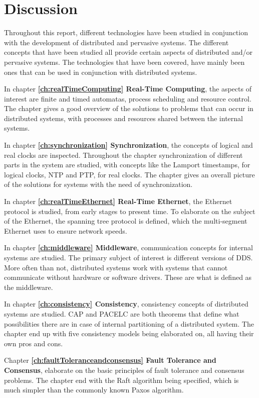 \chapter{Discussion} \label{ch:discussion}

Throughout this report, different technologies have been studied in conjunction with the development of distributed and pervasive systems. The different concepts that have been studied all provide certain aspects of distributed and/or pervasive systems. The technologies that have been covered, have mainly been ones that can be used in conjunction with distributed systems.

In chapter \textbf{\ref{ch:realTimeComputing} Real-Time Computing}, the aspects of interest are finite and timed automatas, process scheduling and resource control. The chapter gives a good overview of the solutions to problems that can occur in distributed systems, with processes and resources shared between the internal systems.

In chapter \textbf{\ref{ch:synchronization} Synchronization}, the concepts of logical and real clocks are inspected. Throughout the chapter synchronization of different parts in the system are studied, with concepts like the Lamport timestamps, for logical clocks, NTP and PTP, for real clocks. The chapter gives an overall picture of the solutions for systems with the need of synchronization.

In chapter \textbf{\ref{ch:realTimeEthernet} Real-Time Ethernet}, the Ethernet protocol is studied, from early stages to present time. To elaborate on the subject of the Ethernet, the spanning tree protocol is defined, which the multi-segment Ethernet uses to ensure network speeds. 

In chapter \textbf{\ref{ch:middleware} Middleware}, communication concepts for internal systems are studied. The primary subject of interest is different versions of DDS. More often than not, distributed systems work with systems that cannot communicate without hardware or software drivers. These are what is defined as the middleware.

In chapter \textbf{\ref{ch:consistency} Consistency}, consistency concepts of distributed systems are studied. CAP and PACELC are both theorems that define what possibilities there are in case of internal partitioning of a distributed system. The chapter end up with five consistency models being elaborated on, all having their own pros and cons.

Chapter \textbf{\ref{ch:faultToleranceandconsensus} Fault Tolerance and Consensus}, elaborate on the basic principles of fault tolerance and consensus problems. The chapter end with the Raft algorithm being specified, which is much simpler than the commonly known Paxos algorithm.

